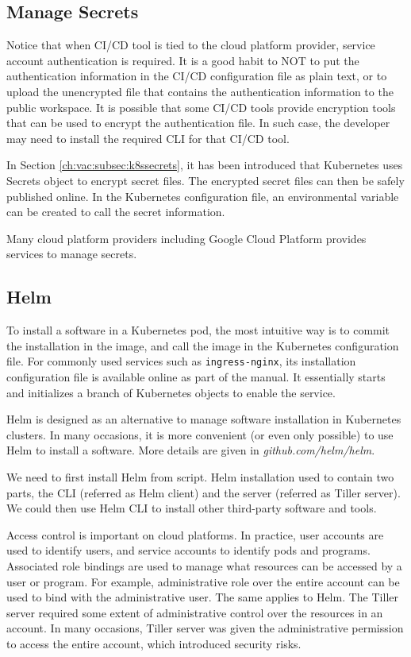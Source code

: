 \subsection{Manage Secrets}

Notice that when CI/CD tool is tied to the cloud platform provider, service account authentication is required. It is a good habit to NOT to put the authentication information in the CI/CD configuration file as plain text, or to upload the unencrypted file that contains the authentication information to the public workspace. It is possible that some CI/CD tools provide encryption tools that can be used to encrypt the authentication file. In such case, the developer may need to install the required CLI for that CI/CD tool.

In Section \ref{ch:vac:subsec:k8ssecrets}, it has been introduced that Kubernetes uses Secrets object to encrypt secret files. The encrypted secret files can then be safely published online. In the Kubernetes configuration file, an environmental variable can be created to call the secret information.

Many cloud platform providers including Google Cloud Platform provides services to manage secrets.

\subsection{Helm}

To install a software in a Kubernetes pod, the most intuitive way is to commit the installation in the image, and call the image in the Kubernetes configuration file. For commonly used services such as \verb|ingress-nginx|, its installation configuration file is available online as part of the manual. It essentially starts and initializes a branch of Kubernetes objects to enable the service.

Helm is designed as an alternative to manage software installation in Kubernetes clusters. In many occasions, it is more convenient (or even only possible) to use Helm to install a software. More details are given in \textit{github.com/helm/helm}.

We need to first install Helm from script. Helm installation used to contain two parts, the CLI (referred as Helm client) and the server (referred as Tiller server). We could then use Helm CLI to install other third-party software and tools.

Access control is important on cloud platforms. In practice, user accounts are used to identify users, and service accounts to identify pods and programs. Associated role bindings are used to manage what resources can be accessed by a user or program. For example, administrative role over the entire account can be used to bind with the administrative user. The same applies to Helm. The Tiller server required some extent of administrative control over the resources in an account. In many occasions, Tiller server was given the administrative permission to access the entire account, which introduced security risks.

